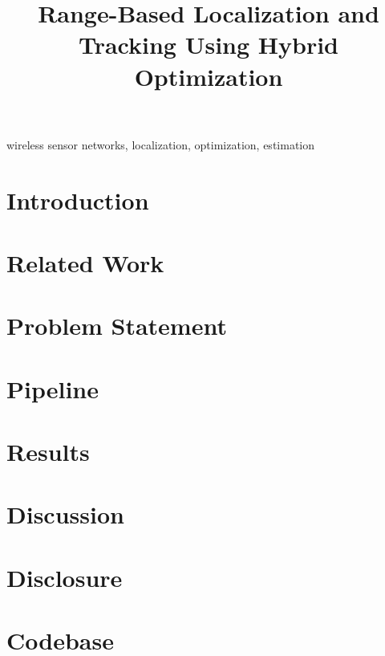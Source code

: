 \documentclass[conference]{IEEEtran}
\begin{document}
\title{Range-Based Localization and Tracking Using Hybrid Optimization}

\author{
}

\maketitle

\begin{abstract}


\end{abstract}

\begin{IEEEkeywords}
wireless sensor networks, localization, optimization, estimation
\end{IEEEkeywords}

\section{Introduction}
\label{sec:intro}


\section{Related Work}
\label{sec:related-work}


\section{Problem Statement}
\label{sec:prob-statement}



\section{Pipeline}
\label{sec:pipeline}


\section{Results}
\label{sec:result}



\section{Discussion}



\section{Disclosure}



\section{Codebase}



\printbibliography
\end{document}
